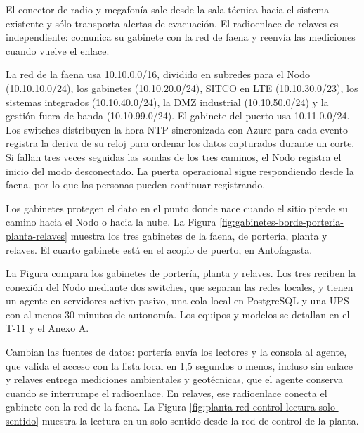 \documentclass[subdoc]{../../comun/overfore}
\begin{document}
El conector de radio y megafonía sale desde la sala técnica hacia el sistema existente y sólo transporta alertas de evacuación. El radioenlace de relaves es independiente: comunica su gabinete con la red de faena y reenvía las mediciones cuando vuelve el enlace.

La red de la faena usa 10.10.0.0/16, dividido en subredes para el Nodo (10.10.10.0/24), los gabinetes (10.10.20.0/24), SITCO en LTE (10.10.30.0/23), los sistemas integrados (10.10.40.0/24), la DMZ industrial (10.10.50.0/24) y la gestión fuera de banda (10.10.99.0/24). El gabinete del puerto usa 10.11.0.0/24. Los switches distribuyen la hora NTP sincronizada con Azure para cada evento registra la deriva de su reloj para ordenar los datos capturados durante un corte. Si fallan tres veces seguidas las sondas de los tres caminos, el Nodo registra el inicio del modo desconectado. La puerta operacional sigue respondiendo desde la faena, por lo que las personas pueden continuar registrando.

Los gabinetes protegen el dato en el punto donde nace cuando el sitio pierde su camino hacia el Nodo o hacia la nube. La Figura \ref{fig:gabinetes-borde-porteria-planta-relaves} muestra los tres gabinetes de la faena, de portería, planta y relaves. El cuarto gabinete está en el acopio de puerto, en Antofagasta.

\begin{horizontal}
\end{horizontal}
La Figura compara los gabinetes de portería, planta y relaves. Los tres reciben la conexión del Nodo mediante dos switches, que separan las redes locales, y tienen un agente en servidores activo-pasivo, una cola local en PostgreSQL y una UPS con al menos 30 minutos de autonomía. Los equipos y modelos se detallan en el T-11 y el Anexo A.

Cambian las fuentes de datos: portería envía los lectores y la consola al agente, que valida el acceso con la lista local en 1,5 segundos o menos, incluso sin enlace y relaves entrega mediciones ambientales y geotécnicas, que el agente conserva cuando se interrumpe el radioenlace. En relaves, ese radioenlace conecta el gabinete con la red de la faena. La Figura \ref{fig:planta-red-control-lectura-solo-sentido} muestra la lectura en un solo sentido desde la red de control de la planta.
\end{document}
